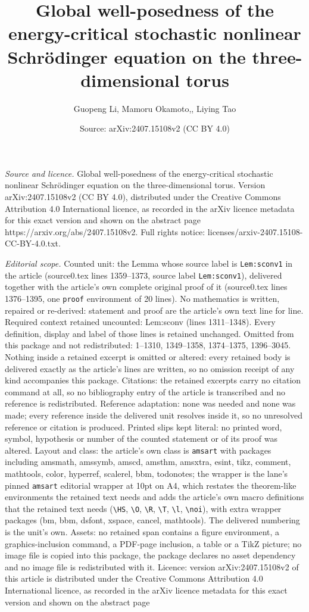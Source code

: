 \documentclass[10pt,a4paper]{amsart}
\title[Global well-posedness of the energy-critical stochastic nonl]{Global well-posedness of the energy-critical stochastic nonlinear Schr\"odinger equation on the three-dimensional torus}
\author{Guopeng Li, Mamoru Okamoto,, Liying Tao}
\date{Source: arXiv:2407.15108v2 (CC BY 4.0)}
\begin{document}
\maketitle

\noindent\emph{Source and licence.} Global well-posedness of the energy-critical stochastic nonlinear Schr\"odinger equation on the three-dimensional torus. Version arXiv:2407.15108v2 (CC BY 4.0), distributed under the Creative Commons Attribution 4.0 International licence, as recorded in the arXiv licence metadata for this exact version and shown on the abstract page https://arxiv.org/abs/2407.15108v2. Full rights notice: licenses/arxiv-2407.15108-CC-BY-4.0.txt.\par\smallskip

\noindent\textit{Editorial scope.} Counted unit: the Lemma whose source label is \texttt{Lem:sconv1} in the article (source0.tex lines 1359--1373, source label \texttt{Lem:sconv1}), delivered together with the article's own complete original proof of it (source0.tex lines 1376--1395, one \texttt{proof} environment of 20 lines). No mathematics is written, repaired or re-derived: statement and proof are the article's own text line for line. Required context retained uncounted: Lem:sconv (lines 1311--1348). Every definition, display and label of those lines is retained unchanged. Omitted from this package and not redistributed: 1--1310, 1349--1358, 1374--1375, 1396--3045. Nothing inside a retained excerpt is omitted or altered: every retained body is delivered exactly as the article's lines are written, so no omission receipt of any kind accompanies this package. Citations: the retained excerpts carry no citation command at all, so no bibliography entry of the article is transcribed and no reference is redistributed. Reference adaptation: none was needed and none was made; every reference inside the delivered unit resolves inside it, so no unresolved reference or citation is produced. Printed slips kept literal: no printed word, symbol, hypothesis or number of the counted statement or of its proof was altered. Layout and class: the article's own class is \texttt{amsart} with packages including amsmath, amssymb, amscd, amsthm, amsxtra, esint, tikz, comment, mathtools, color, hyperref, scalerel, bbm, todonotes; the wrapper is the lane's pinned \texttt{amsart} editorial wrapper at 10pt on A4, which restates the theorem-like environments the retained text needs and adds the article's own macro definitions that the retained text needs (\texttt{\textbackslash HS}, \texttt{\textbackslash O}, \texttt{\textbackslash R}, \texttt{\textbackslash T}, \texttt{\textbackslash l}, \texttt{\textbackslash noi}), with extra wrapper packages (bm, bbm, dsfont, xspace, cancel, mathtools). The delivered numbering is the unit's own. Assets: no retained span contains a figure environment, a graphics-inclusion command, a PDF-page inclusion, a table or a TikZ picture; no image file is copied into this package, the package declares no asset dependency and no image file is redistributed with it. Licence: version arXiv:2407.15108v2 of this article is distributed under the Creative Commons Attribution 4.0 International licence, as recorded in the arXiv licence metadata for this exact version and shown on the abstract page 
\end{document}
